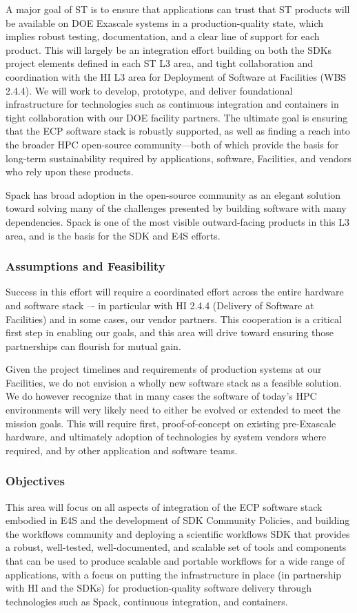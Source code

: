 A major goal of ST is to ensure that applications can trust that ST products will be available on DOE Exascale systems in a production-quality state, which implies robust testing, documentation, and a clear line of support for each product. This will largely be an integration effort building on both the SDKs project elements defined in each ST L3 area, and tight collaboration and coordination with the HI L3 area for Deployment of Software at Facilities (WBS 2.4.4). We will work to develop, prototype, and deliver foundational infrastructure for technologies such as continuous integration and containers in tight collaboration with our DOE facility partners. The ultimate goal is ensuring that the ECP software stack is robustly supported, as well as finding a reach into the broader HPC open-source community---both of which provide the basis for long-term sustainability required by applications, software, Facilities, and vendors who rely upon these products.

Spack has broad adoption in the open-source community as an elegant solution toward solving many of the challenges presented by building software with many dependencies. Spack is one of the most visible outward-facing products in this L3 area, and is the basis for the SDK and E4S efforts.

\subsubsection{Assumptions and Feasibility}
Success in this effort will require a coordinated effort across the entire hardware and software stack –- in particular with HI 2.4.4 (Delivery of Software at Facilities) and in some cases, our vendor partners.  This cooperation is a critical first step in enabling our goals, and this area will drive toward ensuring those partnerships can flourish for mutual gain.

Given the project timelines and requirements of production systems at our Facilities, we do not envision a wholly new software stack as a feasible solution. We do however recognize that in many cases the software of today's HPC environments will very likely need to either be evolved or extended to meet the mission goals. This will require first, proof-of-concept on existing pre-Exascale hardware, and ultimately adoption of technologies by system vendors where required, and by other application and software teams.

\subsubsection{Objectives}
This area will focus on all aspects of integration of the ECP software stack embodied in E4S and the development of SDK Community Policies, and building the workflows community and deploying a scientific workflows SDK that provides a robust, well-tested, well-documented, and scalable set of tools and components that can be used to produce scalable and portable workflows for a wide range of applications, with a focus on putting the infrastructure in place (in partnership with HI and the SDKs) for production-quality software delivery through technologies such as Spack, continuous integration, and containers. 


